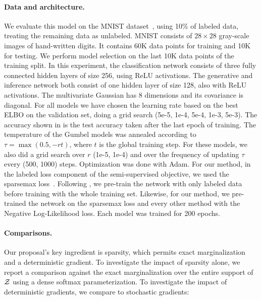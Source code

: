 \paragraph*{Data and architecture.} We evaluate this model on the
MNIST dataset~\citep{lecun1998gradient}, using 10\% of labeled data,
treating the remaining data as unlabeled. MNIST consists of $28
    \times 28$ gray-scale images of hand-written digits. It contains
60K data points for training and 10K for testing. We
perform model selection on the last 10K data points of the training
split. In this experiment, the classification network consists of
three fully connected hidden layers of size 256, using ReLU
activations. The generative and inference network both consist of one
hidden layer of size 128, also with ReLU activations. The
multivariate Gaussian has 8 dimensions and its covariance is
diagonal. For all models we have chosen the learning rate based on
the best ELBO on the validation set, doing a grid search (5e-5, 1e-4,
5e-4, 1e-3, 5e-3). The accuracy shown in  is
the test accuracy taken after the last epoch of training. The
temperature of the Gumbel models was annealed according to $\tau =
    \max\left(0.5, -rt\right)$, where $t$ is the global training step.
For these models, we also did a grid search over $r$ (1e-5, 1e-4) and
over the frequency of updating $\tau$ every (500, 1000) steps.
Optimization was done with Adam. For our method, in the labeled loss
component of the semi-supervised objective, we used the sparsemax
loss~\citep{sparsemax}. Following \citet{RB19}, we pre-train
the network with only labeled data before training with the whole
training set. Likewise, for our method, we pre-trained the network on
the sparsemax loss and every other method with the Negative
Log-Likelihood loss. Each model was trained for 200 epochs.

\paragraph*{Comparisons.} Our proposal's key ingredient is sparsity,
which permits exact marginalization and a deterministic gradient. To
investigate the impact of sparsity alone, we report a comparison
against the exact marginalization over the entire support of $\mathcal{Z}$ using
a dense softmax parameterization. To investigate the impact of
deterministic gradients, we compare to stochastic gradients:

